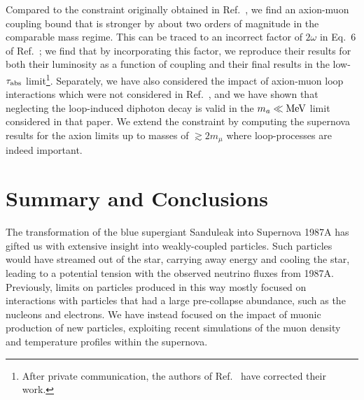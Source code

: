 \documentclass[11pt]{article}
\begin{document}
Compared to the constraint originally obtained in Ref.~\cite{Bollig:2020xdr}, we find an axion-muon coupling bound that is stronger by about two orders of magnitude in the comparable mass regime. This can be traced to an incorrect factor of $2\omega$ in Eq.~6 of Ref.~\cite{Bollig:2020xdr}; we find that by incorporating this factor, we reproduce their results for both their luminosity as a function of coupling and their final results in the low-$\tau_{\rm abs}$ limit\footnote{After private communication, the authors of Ref.~\cite{Bollig:2020xdr} have corrected their work.}. Separately, we have also considered the impact of axion-muon loop interactions which were not considered in Ref.~\cite{Bollig:2020xdr}, and we have shown that neglecting the loop-induced diphoton decay is valid in the $m_a \ll \operatorname{MeV}$ limit considered in that paper. We extend the constraint by computing the supernova results for the axion limits up to masses of $\gtrsim 2m_\mu$ where loop-processes are indeed important.



\section{Summary and Conclusions}
\label{sec:conclusion}

The transformation of the blue supergiant Sanduleak into Supernova 1987A has gifted us with extensive insight into weakly-coupled particles. 
Such particles would have streamed out of the star, carrying away energy and cooling the star, leading to a potential tension with the observed neutrino fluxes from 1987A. Previously, limits on particles produced in this way mostly focused on interactions with particles that had a large pre-collapse abundance, such as the nucleons and electrons. We have instead focused on the impact of muonic production of new particles, exploiting recent simulations of the muon density and temperature profiles within the supernova.
\end{document}
